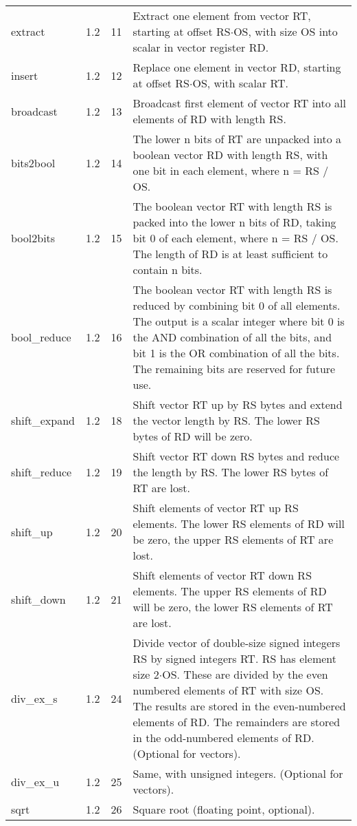 \documentclass[forwardcom.tex]{subfiles}
\begin{document}
\begin{longtable} {|p{20mm}|p{10mm}|p{8mm}|p{75mm}|}
extract       & 1.2 & 11 & Extract one element from vector RT, starting at offset RS$\cdot$OS, with size OS into scalar in vector register RD. \\
insert        & 1.2 & 12 & Replace one element in vector RD, starting at offset RS$\cdot$OS, with scalar RT. \\
broadcast     & 1.2 & 13 & Broadcast first element of vector RT into all elements of RD with length RS. \\
bits2bool     & 1.2 & 14 & The lower n bits of RT are unpacked into a boolean vector RD with length RS, with one bit in each element, where n = RS / OS. \\
bool2bits     & 1.2 & 15 & The boolean vector RT with length RS is packed into the lower n bits of RD, taking bit 0 of each element, where n = RS / OS. The
length of RD is at least sufficient to contain n bits. \\
bool\_reduce  & 1.2 & 16 & The boolean vector RT with length RS is reduced by combining bit 0 of all elements. The output is a scalar integer where bit 0 is the
AND combination of all the bits, and bit 1 is the OR combination of
all the bits. The remaining bits are reserved for future use. \\
shift\_expand & 1.2 & 18 & Shift vector RT up by RS bytes and extend the vector length by RS. The lower RS bytes of RD will be zero. \\
shift\_reduce & 1.2 & 19 & Shift vector RT down RS bytes and reduce the length by RS. The lower RS bytes of RT are lost. \\
shift\_up     & 1.2 & 20 & Shift elements of vector RT up RS elements. The lower RS elements of RD will be zero, the upper RS elements of RT are lost. \\
shift\_down   & 1.2 & 21 & Shift elements of vector RT down RS elements. The upper RS
elements of RD will be zero, the lower RS elements of RT are lost. \\
div\_ex\_s    & 1.2 & 24 & Divide vector of double-size signed integers RS by signed integers RT. RS has element size 2$\cdot$OS. These are divided by the even numbered
elements of RT with size OS. The results are stored in
the even-numbered elements of RD. The remainders are stored in
the odd-numbered elements of RD. (Optional for vectors). \\
div\_ex\_u    & 1.2 & 25 & Same, with unsigned integers. (Optional for vectors). \\
sqrt          & 1.2 & 26 & Square root (floating point, optional). \\

\end{longtable}
\end{document}
